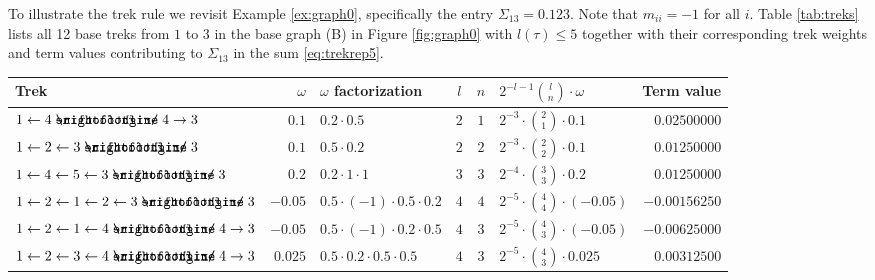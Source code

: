 \documentclass[10pt,twoside,a4paper]{amsart}
\DeclareRobustCommand{\unEdge}{%
	\mathrel{%
		\text{%
			\ooalign{$\rightfootline$\cr\reflectbox{$\rightfootline$}\cr}%
		}%
	}%
}
\begin{document}
\begin{ex} \label{ex:graph0_cont} To illustrate the trek rule we revisit
Example \ref{ex:graph0}, specifically the entry $\Sigma_{13} = 0.123$.
Note that $m_{ii} = -1$ for all $i$. 
Table \ref{tab:treks} lists all 12 base treks from $1$ to $3$ in the base graph (B) in Figure 
\ref{fig:graph0} with $l(\tau) \leq 5$ together with their corresponding 
trek weights and term values contributing to $\Sigma_{13}$ in the sum \eqref{eq:trekrep5}. 

\setlength{\tabcolsep}{4.5pt} %
\renewcommand{\arraystretch}{1.45} 

\begin{table}[h]
    \centering
    {\footnotesize 
    \begin{tabular}{lrlcclr}
         Trek & $\omega$ & $\omega$ factorization  &  $l$ &  $n$ & 
         $2^{-l - 1} {l \choose n} \cdot \omega$ & Term value \\
        \hline
        $1 \leftarrow 4 \unEdge 4 \rightarrow 3$ & $0.1$ & $0.2 \cdot 0.5$ & 
        $2$ & $1$ & $2^{-3} \cdot {2 \choose 1} \cdot 0.1$ & $0.02500000$  \\
        
        $1 \leftarrow 2 \leftarrow 3 \unEdge 3$ & $0.1$ & $0.5 \cdot 0.2$ & 
        $2$ & $2$ & $2^{-3} \cdot {2 \choose 2} \cdot 0.1$ & $0.01250000$  \\
        
        \hline
        
        $1 \leftarrow 4 \leftarrow 5 \leftarrow 3 \unEdge 3$ & 
        $0.2$ & $0.2 \cdot 1 \cdot 1$ & 
        $3$ & $3$ & $2^{-4} \cdot {3 \choose 3} \cdot 0.2$ & $0.01250000$  \\
        
        \hline
        
        $1 \leftarrow 2 \leftarrow 1 \leftarrow 2 \leftarrow 3 \unEdge 3$ & 
        $-0.05$ & $0.5 \cdot (- 1) \cdot 0.5 \cdot 0.2$ & 
        $4$ & $4$ & $2^{-5} \cdot {4 \choose 4} \cdot (-0.05)$ & $-0.00156250$  \\
        
        $1 \leftarrow 2 \leftarrow 1 \leftarrow 4 \unEdge 4 \rightarrow 3$ & 
        $-0.05$ & $0.5 \cdot (-1) \cdot 0.2 \cdot 0.5$ & 
        $4$ & $3$ & $2^{-5} \cdot {4 \choose 3} \cdot (-0.05)$ & $-0.00625000$  \\

        $1 \leftarrow 2 \leftarrow 3 \leftarrow 4 \unEdge 4 \rightarrow 3$ & 
        $0.025$ & $0.5 \cdot 0.2 \cdot 0.5 \cdot 0.5$ & 
        $4$ & $3$ & $2^{-5} \cdot {4 \choose 3} \cdot 0.025$ & $0.00312500$  \\
        

\end{tabular}}
\end{table}
\end{ex}
\end{document}
